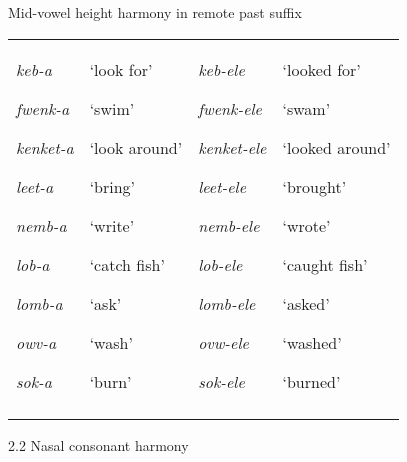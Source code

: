 \documentclass[output=paper]{langsci/langscibook}
\begin{document}
\begin{stylelsTableHeading}%
\begin{table}
\caption{Mid-vowel height harmony in remote past suffix}
\label{tab:3}
\end{table}\end{stylelsTableHeading}

\begin{tabular}{llll}
\lsptoprule
{\mdseries \emph{keb-a}}

{\mdseries \emph{fwenk-a}}

{\mdseries \emph{kenket-a}}

{\mdseries \emph{leet-a}}

{\mdseries \emph{nemb-a}}

{\mdseries \emph{lob-a}}

{\mdseries \emph{lomb-a}}

{\mdseries \emph{owv-a}}

\mdseries \emph{sok-a} & {\mdseries ‘look for’}

{\mdseries ‘swim’}

{\mdseries ‘look around’}

{\mdseries ‘bring’}

{\mdseries ‘write’}

{\mdseries ‘catch fish’}

{\mdseries ‘ask’}

{\mdseries ‘wash’}

\mdseries ‘burn’ & {\mdseries \emph{keb-ele}}

{\mdseries \emph{fwenk-ele}}

{\mdseries \emph{kenket-ele}}

{\mdseries \emph{leet-ele}}

{\mdseries \emph{nemb-ele}}

{\mdseries \emph{lob-ele}}

{\mdseries \emph{lomb-ele}}

{\mdseries \emph{ovw-ele}}

\mdseries \emph{sok-ele} & {\mdseries ‘looked for’}

{\mdseries ‘swam’}

{\mdseries ‘looked around’}

{\mdseries ‘brought’}

{\mdseries ‘wrote’}

{\mdseries ‘caught fish’}

{\mdseries ‘asked’}

{\mdseries ‘washed’}

\mdseries ‘burned’\\
\lspbottomrule
\end{tabular}
\begin{stylelsSectionii}
2.2 Nasal consonant harmony 
\end{stylelsSectionii}
\end{document}
